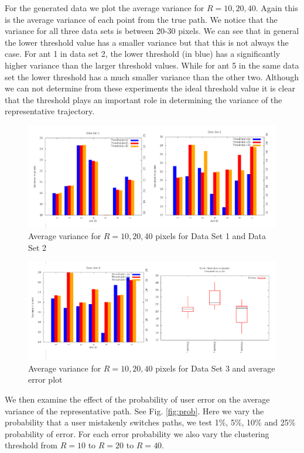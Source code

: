 \documentclass[12pt]{article}
\begin{document}

For the generated data we plot the average variance for $R = 10,20,40$. Again this is the average variance of each point from the true path. We notice that the variance for all three data sets is between 20-30 pixels. We can see that in general the lower threshold value has a smaller variance but that this is not always the case. For ant 1 in data set 2, the lower threshold (in blue) has a significantly higher variance than the larger threshold values. While for ant 5 in the same data set the lower threshold has a much smaller variance than the other two. Although we can not determine from these experiments the ideal threshold value it is clear that the threshold plays an important role in determining the variance of the representative trajectory. 
\begin{figure}[h!]
\centering
\includegraphics[width=6in]{GDataPLot1.png}
\caption{Average variance for $R=10,20,40$ pixels for Data Set 1 and Data Set 2}
\label{fig:error}
\end{figure}

\begin{figure}[h!]
\centering
\includegraphics[width=6in]{GDataPlot2.png}
\caption{Average variance for $R=10,20,40$ pixels for Data Set 3 and average error plot}
\label{fig:error}
\end{figure}
We then examine the effect of the probability of  user error on the average variance of the representative path. See Fig. \ref{fig:prob}. Here we vary the probability that a user mistakenly switches paths, we test 1\%, 5\%, 10\% and 25\% probability of error. For each error probability we also vary the clustering threshold from $R=10$ to $R=20$ to $R=40$. 
\end{document}
